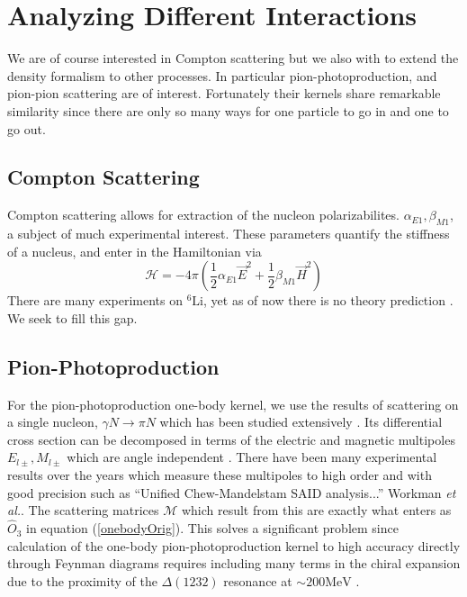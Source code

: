 \documentclass[a4paper,11pt]{article}
\newcommand{\etal}{\textit{et al.}}
\newcommand{\LiS}{{}^{6} \mathrm{Li} }
\newcommand\bv[1]{\vec{#1}}
\newcommand{\MeV}{\mathrm{MeV}}
\begin{document}
\section{Analyzing Different Interactions}
We are of course interested in Compton scattering but we also with to extend the density
formalism to other processes. In particular pion-photoproduction, and
pion-pion scattering are of interest.
Fortunately their kernels share remarkable similarity since there are
only so many ways for one particle to go in and one to go out.
\subsection{Compton Scattering}
Compton scattering allows for extraction of the nucleon polarizabilites.
$\alpha_{E1}, \beta_{M1}$, a subject of much experimental interest. 
These parameters quantify the stiffness of a nucleus, and enter in the Hamiltonian via
\begin{equation}
    \mathcal{H}=-4\pi \left( \frac{1}{2} \alpha_{E1} \bv{E}^2 + \frac{1}{2} \beta_{M1} \bv{H}^2\right)
\end{equation}
There are many experiments on $\LiS$, yet as of now there is no theory prediction \cite{60MeV,86MeV}. We seek to fill this gap.


\subsection{Pion-Photoproduction}
For the pion-photoproduction one-body kernel, we use the results of scattering on a single nucleon, $\gamma N \to \pi N$ which has
been studied extensively \cite{pionphoto, Rijneveen2021,Workman2012,Briscoe2023}.
Its differential cross section can be decomposed in terms of the
electric and magnetic multipoles $E_{l\pm}, M_{l\pm}$ which are angle
independent  \cite{pionphoto}.
There have been many experimental results over the years
which measure these multipoles to high order and with good precision
such as ``Unified Chew-Mandelstam SAID analysis...'' Workman \etal \cite{multipolePionPion}.
The scattering matrices $\mathcal{M}$ which result from this are exactly what enters as $\hat{O}_3$ in equation (\ref{onebodyOrig}). 
This solves a significant problem since calculation of the one-body pion-photoproduction kernel to high accuracy directly through Feynman diagrams requires including many terms in the chiral expansion due to the proximity of the $\Delta(1232)$ resonance at $\sim 200\MeV$ \cite{chiralpionphoto}.
\end{document}
